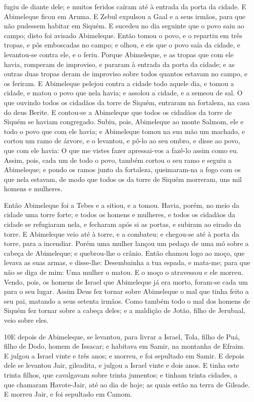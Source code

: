fugiu de diante dele; e muitos feridos caíram até à entrada da porta
da cidade. E Abimeleque ficou em Aruma. E Zebul expulsou a
Gaal e a seus irmãos, para que não pudessem habitar em Siquém.
E sucedeu no dia seguinte que o povo saiu ao campo; disto foi
avisado Abimeleque. Então tomou o povo, e o repartiu em três
tropas, e pôs emboscadas no campo; e olhou, e eis que o povo saía da
cidade, e levantou-se contra ele, e o feriu. Porque
Abimeleque, e as tropas que com ele havia, romperam de improviso, e
pararam à entrada da porta da cidade; e as outras duas tropas deram
de improviso sobre todos quantos estavam no campo, e os feriram.
E Abimeleque pelejou contra a cidade todo aquele dia, e tomou
a cidade, e matou o povo que nela havia; e assolou a cidade, e a
semeou de sal. O que ouvindo todos os cidadãos da torre de
Siquém, entraram na fortaleza, na casa do deus Berite. E
contou-se a Abimeleque que todos os cidadãos da torre de Siquém se
haviam congregado. Subiu, pois, Abimeleque ao monte Salmom,
ele e todo o povo que com ele havia; e Abimeleque tomou na sua mão
um machado, e cortou um ramo de árvore, e o levantou, e pô-lo ao seu
ombro, e disse ao povo, que com ele havia: O que me vistes fazer
apressai-vos a fazê-lo assim como eu. Assim, pois, cada um de
todo o povo, também cortou o seu ramo e seguiu a Abimeleque; e pondo
os ramos junto da fortaleza, queimaram-na a fogo com os que nela
estavam, de modo que todos os da torre de Siquém morreram, uns mil
homens e mulheres.

Então Abimeleque foi a Tebes e a sitiou, e a tomou. Havia,
porém, no meio da cidade uma torre forte; e todos os homens e
mulheres, e todos os cidadãos da cidade se refugiaram nela, e
fecharam após si as portas, e subiram ao eirado da torre. E
Abimeleque veio até à torre, e a combateu; e chegou-se até à porta
da torre, para a incendiar. Porém uma mulher lançou um pedaço
de uma mó sobre a cabeça de Abimeleque; e quebrou-lhe o crânio.
Então chamou logo ao moço, que levava as suas armas, e
disse-lhe: Desembainha a tua espada, e mata-me; para que não se diga
de mim: Uma mulher o matou. E o moço o atravessou e ele morreu.
Vendo, pois, os homens de Israel que Abimeleque já era morto,
foram-se cada um para o seu lugar. Assim Deus fez tornar
sobre Abimeleque o mal que tinha feito a seu pai, matando a seus
setenta irmãos. Como também todo o mal dos homens de Siquém
fez tornar sobre a cabeça deles; e a maldição de Jotão, filho de
Jerubaal, veio sobre eles.

\medskip

\lettrine{10} E depois de Abimeleque, se levantou, para livrar
a Israel, Tola, filho de Puá, filho de Dodo, homem de Issacar; e
habitava em Samir, na montanha de Efraim. E julgou a Israel
vinte e três anos; e morreu, e foi sepultado em Samir. E depois
dele se levantou Jair, gileadita, e julgou a Israel vinte e dois
anos. E tinha este trinta filhos, que cavalgavam sobre trinta
jumentos; e tinham trinta cidades, a que chamaram Havote-Jair, até
ao dia de hoje; as quais estão na terra de Gileade. E morreu
Jair, e foi sepultado em Camom.


